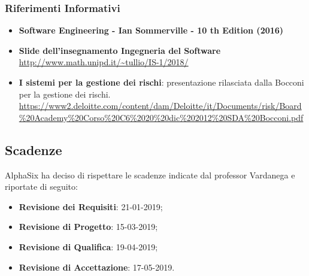 		\subsubsection{Riferimenti Informativi}
			\begin{itemize}
				\item \textbf{Software Engineering - Ian Sommerville - 10 th Edition (2016)}
				\item \textbf{Slide dell’insegnamento Ingegneria del Software}\\
				\url{http://www.math.unipd.it/~tullio/IS-1/2018/}
				\item \textbf{I sistemi per la gestione dei rischi}: presentazione rilasciata dalla Bocconi per la gestione dei rischi.\\
				\url{https://www2.deloitte.com/content/dam/Deloitte/it/Documents/risk/Board\%20Academy\%20Corso\%20C6\%2020\%20dic\%202012\%20SDA\%20Bocconi.pdf}
			\end{itemize}
		
	\subsection{Scadenze}
	AlphaSix ha deciso di rispettare le scadenze indicate dal professor Vardanega e riportate di seguito:
	\begin{itemize}
		\item \textbf{Revisione dei Requisiti}: 21-01-2019;
		\item \textbf{Revisione di Progetto}: 15-03-2019;
		\item \textbf{Revisione di Qualifica}: 19-04-2019;
		\item \textbf{Revisione di Accettazione}: 17-05-2019.
	\end{itemize}
	
